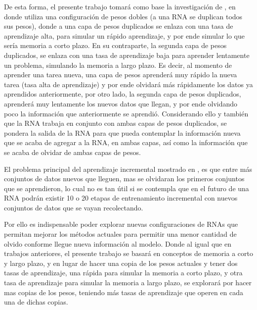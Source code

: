     De esta forma, el presente trabajo tomar\'a como base la investigación de \cite{bullinaria2009}, 
    en donde utiliza una configuración de pesos dobles (a una RNA se duplican todos sus pesos), 
    donde a una capa de pesos duplicados se enlaza con una tasa de aprendizaje alta, para simular un 
    rápido aprendizaje, y por ende simular lo que sería memoria a corto plazo. En su contraparte, 
    la segunda capa de pesos duplicados, se enlaza con una tasa de aprendizaje baja para aprender 
    lentamente un problema, simulando la memoria a largo plazo.  Es decir, al momento de aprender una 
    tarea nueva,  una capa de pesos aprenderá muy rápido la nueva tarea (tasa alta de aprendizaje) y 
    por ende olvidará más rápidamente los datos ya aprendidos anteriormente, por otro lado, la segunda 
    capa de pesos duplicados, aprenderá muy lentamente los nuevos datos que llegan, y por ende olvidando 
    poco la información que anteriormente se aprendió.  Considerando ello y también que la 
    RNA trabaja en conjunto con ambas capas de pesos duplicados, se pondera la salida de la RNA para 
    que pueda contemplar la información nueva que se acaba de agregar a la RNA, en ambas capas, así como 
    la información que se acaba de olvidar de ambas capas de pesos.

    El problema principal del aprendizaje incremental mostrado en \cite{bullinaria2009}, es que entre 
    más conjuntos de datos nuevos que lleguen, mas se olvidaran los primeros conjuntos que se aprendieron, 
    lo cual no es tan útil si se contempla que en el futuro de una RNA podrán existir 10 o 20 etapas de 
    entrenamiento incremental con nuevos conjuntos de datos que se vayan recolectando.

    Por ello es indispensable poder explorar nuevas configuraciones de RNAs que permitan mejorar los 
    métodos actuales para permitir una menor cantidad de olvido conforme llegue nueva información al 
    modelo. Donde al igual que en trabajos anteriores,  el presente trabajo se basará en conceptos de 
    memoria a corto y largo plazo, y en lugar de hacer una copia de los pesos actuales y tener dos 
    tasas de aprendizaje, una rápida para simular la memoria a corto plazo, y otra tasa de aprendizaje 
    para simular la memoria a largo plazo, se explorará por hacer mas copias de los pesos, teniendo más 
    tasas de aprendizaje que operen en cada una de dichas copias.
    